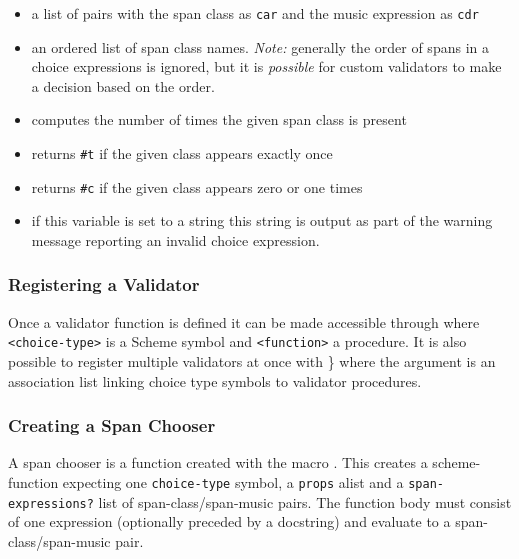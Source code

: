 \documentclass[]{ollmanual}
\begin{document}
\begin{itemize}
\item

  a list of pairs with the span class as \texttt{car} and the music
  expression as \texttt{cdr}
\item

  an ordered list of span class names. \emph{Note:} generally the order
  of spans in a choice expressions is ignored, but it is \emph{possible}
  for custom validators to make a decision based on the order.
\item

  computes the number of times the given span class is present
\item

  returns \texttt{\#t} if the given class appears exactly once
\item

  returns \texttt{\#c} if the given class appears zero or one times
\item

  if this variable is set to a string this string is output as part of
  the warning message reporting an invalid choice expression.
\end{itemize}

\hypertarget{registering-a-validator}{%
\subsubsection{Registering a Validator}\label{registering-a-validator}}

Once a validator function is defined it can be made accessible through
 where
\texttt{\textless{}choice-type\textgreater{}} is a Scheme symbol and
\texttt{\textless{}function\textgreater{}} a procedure. It is also
possible to register multiple validators at once with
\} where the argument is an
association list linking choice type symbols to validator procedures.

\hypertarget{creating-a-span-chooser}{%
\subsubsection{Creating a Span Chooser}\label{creating-a-span-chooser}}

A span chooser is a function created with the macro
. This creates a scheme-function expecting
one \texttt{choice-type} symbol, a \texttt{props} alist and a
\texttt{span-expressions?} list of span-class/span-music pairs. The
function body must consist of one expression (optionally preceded by a
docstring) and evaluate to a span-class/span-music pair.
\end{document}
